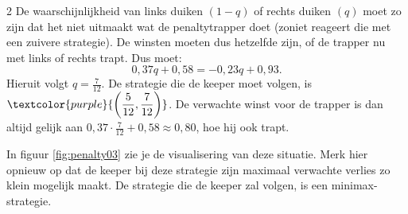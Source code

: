\begin{multicols}{2}
De waarschijnlijkheid van links duiken $(1-q)$ of rechts duiken $(q)$ moet zo zijn dat het niet uitmaakt wat de penaltytrapper doet (zoniet reageert die met een zuivere strategie). De winsten moeten dus hetzelfde zijn, of de trapper nu met links of rechts trapt. Dus moet: $$0,37q+0,58=-0,23q+0,93.$$ Hieruit volgt $\displaystyle q= \frac{7}{12}$. De strategie die de keeper moet volgen, is $\displaystyle \textcolor{purple}{\left(\frac{5}{12}, \frac{7}{12}\right)}$. De verwachte winst voor de trapper is dan altijd gelijk aan $0,37\cdot \frac{7}{12}+0,58\approx 0,80$, hoe hij ook trapt.

In figuur \ref{fig:penalty03} zie je de visualisering van deze situatie. Merk hier opnieuw op dat de keeper bij deze strategie zijn maximaal verwachte verlies zo klein mogelijk maakt. De strategie die de keeper zal volgen, is een minimax-strategie.



\end{multicols}

